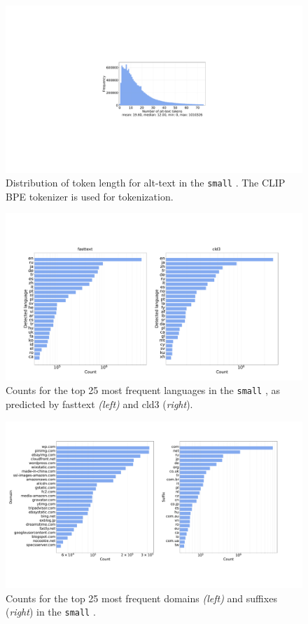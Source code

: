 \begin{figure}
    \centering
    \includegraphics[width=0.7\linewidth]{figures/appx-tokens.pdf}
    \caption{Distribution of token length for alt-text in the {\small \texttt{small}} \pool. The CLIP BPE tokenizer is used for tokenization.}
    \label{fig:tokens}
\end{figure}


\begin{figure}
    \centering
    \includegraphics[width=0.9\linewidth]{figures/appx-langdet.pdf}
    \caption{Counts for the top 25 most frequent languages in the {\small \texttt{small}} \pool, as predicted by fasttext \emph{(left)} and cld3 (\emph{right}).}
    \label{fig:langdet_language}
\end{figure}

\begin{figure}
    \centering
    \includegraphics[width=0.9\linewidth]{figures/appx-domain.pdf}
    \caption{Counts for the top 25 most frequent domains \emph{(left)} and suffixes (\emph{right}) in the {\small \texttt{small}} \pool.}
    \label{fig:domain}
\end{figure}

